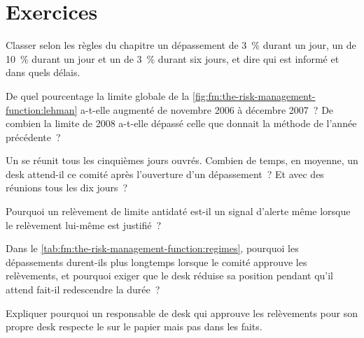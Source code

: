 \section{Exercices}

\begin{exercise}[$\star$]\label{exo:fm:the-risk-management-function:1}
Classer selon les règles du chapitre un dépassement de 3~\% durant un jour, un de 10~\% durant un jour et un de 3~\% durant six jours, et dire qui est informé et
dans quels délais.
\end{exercise}

\begin{exercise}[$\star$]\label{exo:fm:the-risk-management-function:2}
De quel pourcentage la limite globale de la \cref{fig:fm:the-risk-management-function:lehman} a-t-elle augmenté de novembre 2006 à décembre 2007~? De combien
la limite de 2008 a-t-elle dépassé celle que donnait la méthode de l'année précédente~?
\end{exercise}

\begin{exercise}[$\star$]\label{exo:fm:the-risk-management-function:3}
Un  se réunit tous les cinquièmes jours ouvrés. Combien de temps, en moyenne, un desk attend-il ce comité après l'ouverture d'un dépassement~? Et avec des réunions tous les
dix jours~?
\end{exercise}

\begin{exercise}[$\star\star$]\label{exo:fm:the-risk-management-function:4}
Pourquoi un relèvement de limite antidaté est-il un signal d'alerte même lorsque le relèvement lui-même est justifié~?
\end{exercise}

\begin{exercise}[$\star\star$]\label{exo:fm:the-risk-management-function:5}
Dans le \cref{tab:fm:the-risk-management-function:regimes}, pourquoi les dépassements durent-ils plus longtemps lorsque le comité approuve les relèvements, et pourquoi exiger
que le desk réduise sa position pendant qu'il attend fait-il redescendre la durée~?
\end{exercise}

\begin{exercise}[$\star\star$]\label{exo:fm:the-risk-management-function:6}
Expliquer pourquoi un responsable de desk qui approuve les relèvements pour son propre desk respecte le  sur le papier mais pas dans les faits.
\end{exercise}

